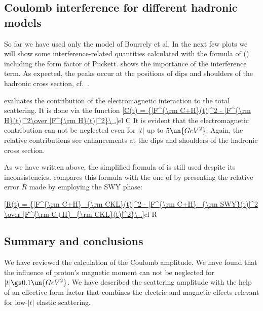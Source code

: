 

\subsection[int mod]{Coulomb interference for different hadronic models}

So far we have used only the model of Bourrely et al. In the next few plots we will show some interference-related quantities calculated with the formula of \KaL{} () including the form factor of Puckett.  shows the importance of the interference term. As expected, the peaks occur at the positions of dips and shoulders of the hadronic cross section, cf.~.

 evaluates the contribution of the electromagnetic interaction to the total scattering. It is done via the function
\eqref{C(t) = {|F^{\rm C+H}(t)|^2 - |F^{\rm H}(t)|^2\over |F^{\rm H}(t)|^2}\ .}{el C}
It is evident that the electromagnetic contribution can not be neglected even for $|t|$ up to $5\un{GeV^2}$. Again, the relative contributions see enhancements at the dips and shoulders of the hadronic cross section.




As we have written above, the simplified formula of \WaY{} is still used despite its inconsistencies.  compares this formula with the one of \KaL{} by presenting the relative error $R$ made by employing the SWY phase:

\eqref{R(t) = {|F^{\rm C+H}_{\rm CKL}(t)|^2 - |F^{\rm C+H}_{\rm SWY}(t)|^2 \over |F^{\rm C+H}_{\rm CKL}(t)|^2}\ .}{el R}


\subsection[int sum]{Summary and conclusions}

We have reviewed the calculation of the Coulomb amplitude. We have found that the influence of proton's magnetic moment can not be neglected for $|t| \gs 0.1\un{GeV^2}$. We have described the scattering amplitude with the help of an effective form factor that combines the electric and magnetic effects relevant for low-$|t|$ elastic scattering.

